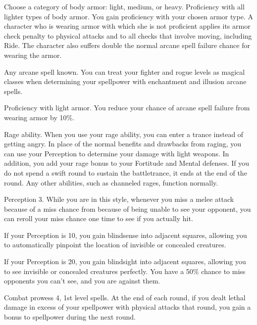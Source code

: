 Choose a category of body armor: light, medium, or heavy.
\featpre Proficiency with all lighter types of body armor.
\featben You gain proficiency with your chosen armor type.
A character who is wearing armor with which she is not proficient applies its armor check penalty to physical attacks and to all checks that involve moving, including Ride.
The character also suffers double the normal arcane spell failure chance for wearing the armor.


\featpre Any arcane spell known.
\featben You can treat your fighter and rogue levels as magical classes when determining your spellpower with enchantment and illusion arcane spells.

\featpre Proficiency with light armor.
\featben You reduce your chance of arcane spell failure from wearing armor by 10\%.

\featpre Rage ability.
\featben When you use your rage ability, you can enter a trance instead of getting angry.
In place of the normal benefits and drawbacks from raging, you can use your Perception to determine your damage with light weapons.
In addition, you add your rage bonus to your Fortitude and Mental defenses.
If you do not spend a swift round to sustain the battletrance, it ends at the end of the round.
Any other abilities, such as channeled rages, function normally.

\featpre Perception 3.
\featben While you are in this style, whenever you miss a melee attack because of a miss chance from because of being unable to see your opponent, you can reroll your miss chance one time to see if you actually hit.
\par If your Perception is 10, you gain blindsense into adjacent squares, allowing you to automatically pinpoint the location of invisible or concealed creatures.
\par If your Perception is 20, you gain blindsight into adjacent squares, allowing you to see invisible or concealed creatures perfectly.
You have a 50\% chance to miss opponents you can't see, and you are  against them.

\featpres Combat prowess 4, 1st level spells.
\featben At the end of each round, if you dealt lethal damage in excess of your spellpower with physical attacks that round, you gain a  bonus to spellpower during the next round.


